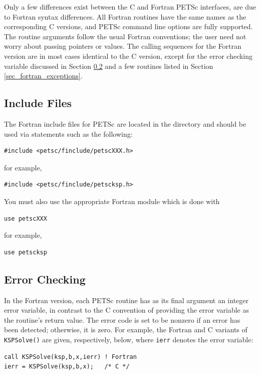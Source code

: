Only a few differences exist between the C and Fortran PETSc
interfaces, are due to Fortran syntax differences.
All Fortran routines have the same names as the corresponding C
versions, and PETSc command line options are fully supported. The
routine arguments follow the usual Fortran conventions; the user need
not worry about passing pointers or values.  The calling sequences
for the Fortran version are in most cases identical to the C version,
except for the error checking variable discussed in
Section \ref{sec_fortran_errors} and a few routines listed in
Section \ref{sec_fortran_exceptions}.

\subsection{Include Files}
\label{sec_fortran_includes}

The Fortran include files for PETSc are located in the directory
 and should be used via statements
such as the following:
\begin{lstlisting}
#include <petsc/finclude/petscXXX.h>
\end{lstlisting}
for example,
\begin{lstlisting}
#include <petsc/finclude/petscksp.h>
\end{lstlisting}
You must also use the appropriate Fortran module which is done with
\begin{lstlisting}
use petscXXX
\end{lstlisting}
for example,
\begin{lstlisting}
use petscksp
\end{lstlisting}

\subsection{Error Checking}
\label{sec_fortran_errors}

In the Fortran version, each PETSc routine has as its final argument
an integer error variable, in contrast to the C convention of
providing the error variable as the routine's return value.  The error
code is set to be nonzero if an error has been detected; otherwise, it
is zero.  For example, the Fortran and C variants of \lstinline{KSPSolve()} are
given, respectively, below, where \lstinline{ierr} denotes the error variable:
\begin{lstlisting}
call KSPSolve(ksp,b,x,ierr) ! Fortran
ierr = KSPSolve(ksp,b,x);   /* C */
\end{lstlisting}

